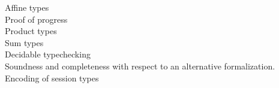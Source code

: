 \documentclass[a4paper,UKenglish,cleveref, autoref, thm-restate,authorcolumns]{lipics-v2019}
\begin{document}
\begin{description}

\item [Affine types]
  
\item [Proof of progress]

\item [Product types]

\item [Sum types]

\item [Decidable typechecking]

\item [Soundness and completeness with respect to an alternative formalization.]

\item [Encoding of session types]

\end{description}



\end{document}
